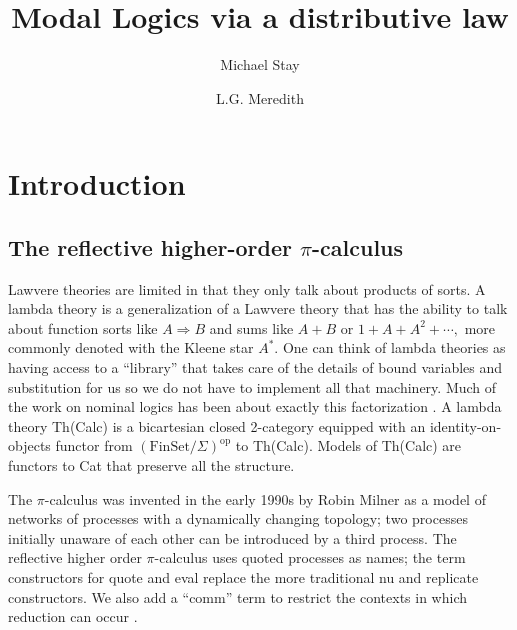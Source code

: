 \documentclass{llncs}
\title{Modal Logics via a distributive law}
\author{
Michael Stay\inst{1}\\
\and
L.G. Meredith\inst{2}\\
}
\institute{
  {Pyrofex Corp.}\\
  \email{\fontsize{8}{8}\selectfont stay@pyrofex.net}\\
  \and
  {Synereo, Ltd}\\
  \email{\fontsize{8}{8}\selectfont greg@synereo.com}
}
\newcommand{\FinSet}{\mathrm{FinSet}}
\newcommand{\op}{\mathrm{op}}
\begin{document}
\maketitle
\begin{abstract}
\noindent

\end{abstract}
\section{Introduction}

\subsection{The reflective higher-order $\pi$-calculus}

Lawvere theories are limited in that they only talk about products of sorts.  A lambda theory is a generalization of a Lawvere theory that has the ability to talk about function sorts like $A \Rightarrow B$ and sums like $A+B$ or $1 + A + A^2 + \cdots,$ more commonly denoted with the Kleene star $A^*.$  One can think of lambda theories as having access to a ``library'' that takes care of the details of bound variables and substitution for us so we do not have to implement all that machinery.  Much of the work on nominal logics has been about exactly this factorization \cite{GabbayMJ:picfm}.  A lambda theory Th(Calc) is a bicartesian closed 2-category equipped with an identity-on-objects functor from $(\FinSet/\Sigma)^{\op}$ to Th(Calc).  Models of Th(Calc) are functors to Cat that preserve all the structure.

The $\pi$-calculus was invented in the early 1990s by Robin Milner as a model of networks of processes with a dynamically changing topology; two processes initially unaware of each other can be introduced by a third process.  The reflective higher order $\pi$-calculus uses quoted processes as names; the term constructors for quote and eval replace the more traditional nu and replicate constructors.  We also add a ``comm'' term to restrict the contexts in which reduction can occur \cite{DBLP:journals/corr/StayM15}.
\end{document}

